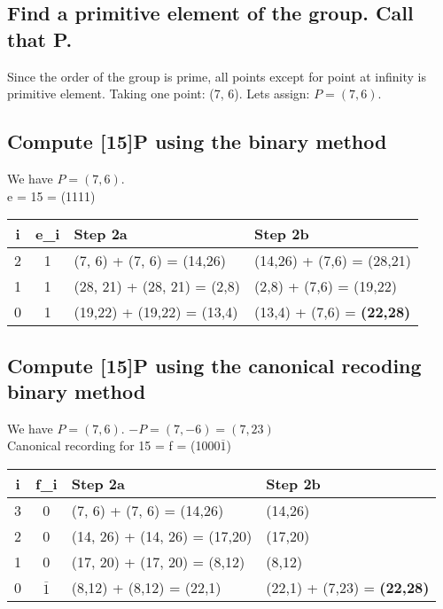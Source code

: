 \documentclass[11pt, pdftex]{article}
\begin{document}
\subsection{Find a primitive element of the group. Call that P.}
Since the order of the group is prime, all points except for point at infinity is primitive element. Taking one point: (7, 6). Lets assign: $P=(7,6)$.
\subsection{Compute [15]P using the binary method}
We have $P=(7,6)$.\\
e = 15 = (1111)
\begin{center}
\begin{tabular}{ |c|c|l|l| } 
 \hline
 i & e_{i} & Step 2a & Step 2b \\
 \hline
 \hline 
 2 & 1 & (7, 6) + (7, 6) = (14,26) & (14,26) + (7,6) = (28,21) \\ 
 1 & 1 & (28, 21) + (28, 21) = (2,8) & (2,8) + (7,6) = (19,22) \\ 
 0 & 1 & (19,22) + (19,22) = (13,4) & (13,4) + (7,6) = {\bf (22,28)} \\
 \hline
\end{tabular}
\end{center}
\subsection{Compute [15]P using the canonical recoding binary method}
We have $P=(7,6)$. $-P = (7,-6) = (7,23)$\\
Canonical recording for 15 = f = (1000$\overline{1}$)
\begin{center}
\begin{tabular}{ |c|c|l|l| } 
 \hline
 i & f_{i} & Step 2a & Step 2b \\
 \hline
 \hline 
 3 & 0 & (7, 6) + (7, 6) = (14,26) & (14,26) \\ 
 2 & 0 & (14, 26) + (14, 26) = (17,20) & (17,20) \\ 
 1 & 0 & (17, 20) + (17, 20) = (8,12) & (8,12) \\ 
 0 & $\overline{1}$ & (8,12) + (8,12) = (22,1) & (22,1) + (7,23) = {\bf (22,28)} \\
 \hline
\end{tabular}
\end{center}
\end{document}
